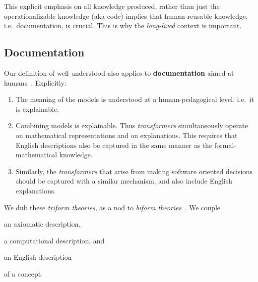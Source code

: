\documentclass[sigconf,review,anonymous=false]{acmart}
\begin{document}
This explicit emphasis on all knowledge produced, rather than just the
operationalizable knowledge (aka code) 
implies that human-reusable knowledge, i.e.\ documentation, is crucial.
This is why the \emph{long-lived} context is important.

\subsection{Documentation}
Our definition of well understood also applies to \textbf{documentation} aimed
at humans~\cite{parnas2011precise}.  Explicitly:
\begin{enumerate}
\item The meaning of the models is understood at a human-pedagogical
level, i.e.\ it is explainable.
\item Combining models is explainable. Thus \emph{transformers}
simultaneously operate on mathematical representations
and on explanations. This requires that English descriptions also be
captured in the same manner as the formal-mathematical knowledge.
\item Similarly, the \emph{transformers} that arise from making software
oriented decisions should be captured with a similar mechanism, and also include
English explanations.
\end{enumerate}

We dub these \emph{triform theories}, as a nod to \emph{biform
theories}~\cite{Farmer2007}. We couple 
\begin{enumerate*}
\item an axiomatic description,
\item a computational description, and
\item an English description
\end{enumerate*}
of a concept.

%
\end{document}
